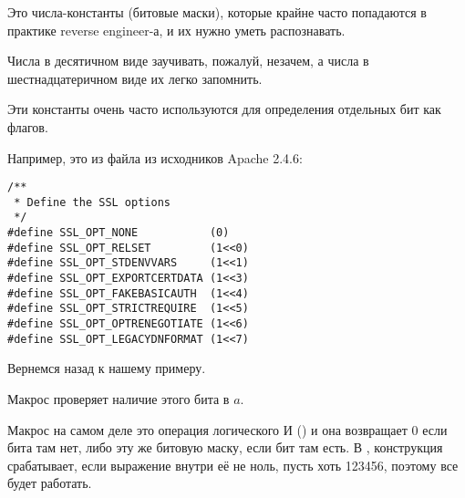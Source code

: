 Это числа-константы (битовые маски), которые крайне часто попадаются в практике reverse engineer-а, 
и их нужно уметь распознавать.

Числа в десятичном виде заучивать, пожалуй, незачем, а числа в шестнадцатеричном
виде их легко запомнить.

Эти константы очень часто используются для определения отдельных бит как флагов.

Например, это из файла  из исходников Apache 2.4.6:

\begin{lstlisting}
/**
 * Define the SSL options
 */
#define SSL_OPT_NONE           (0)
#define SSL_OPT_RELSET         (1<<0)
#define SSL_OPT_STDENVVARS     (1<<1)
#define SSL_OPT_EXPORTCERTDATA (1<<3)
#define SSL_OPT_FAKEBASICAUTH  (1<<4)
#define SSL_OPT_STRICTREQUIRE  (1<<5)
#define SSL_OPT_OPTRENEGOTIATE (1<<6)
#define SSL_OPT_LEGACYDNFORMAT (1<<7)
\end{lstlisting}

Вернемся назад к нашему примеру.

Макрос  проверяет наличие этого бита в $a$.

Макрос  на самом деле это операция логического И () 
и она возвращает 0 если бита там нет, 
либо эту же битовую маску, если бит там есть. 
В \CCpp, конструкция  срабатывает, если выражение внутри её не ноль, пусть хоть 123456, 
поэтому все будет работать.







